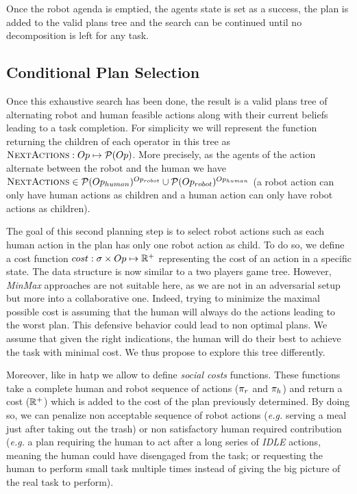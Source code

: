 \documentclass[a4paper,11pt,twoside]{StyleThese}
\begin{document}
Once the robot agenda is emptied, the agents state is set as a success, the plan is added to the valid plans tree and the search can be continued until no decomposition is left for any task.


\subsection{Conditional Plan Selection}
Once this exhaustive search has been done, the result is a valid plans tree of alternating robot and human feasible actions along with their current beliefs leading to a task completion. For simplicity we will represent the function returning the children of each operator in this tree as $\textsc{NextActions}: Op \mapsto \mathcal{P}(Op)$. More precisely, as the agents of the action alternate between the robot and the human we have $\textsc{NextActions} \in \mathcal{P}(Op_{human})^{Op_{robot}} \cup \mathcal{P}(Op_{robot})^{Op_{human}}$ (a robot action can only have human actions as children and a human action can only have robot actions as children). 

The goal of this second planning step is to select robot actions such as each human action in the plan has only one robot action as child.
To do so, we define a cost function $cost: \sigma \times Op \mapsto \mathbb{R}^+$ representing the cost of an action in a specific state. The data structure is now similar to a two players game tree. However, \textit{MinMax} approaches are not suitable here, as we are not in an adversarial setup but more into a collaborative one. Indeed, trying to minimize the maximal possible cost is assuming that the human will always do the actions leading to the worst plan. This defensive behavior could lead to non optimal plans. We assume that given the right indications, the human will do their best to achieve the task with minimal cost. We thus propose to explore this tree differently.

Moreover, like in \acrshort{hatp} we allow to define \textit{social costs} functions. These functions take a complete human and robot sequence of actions ($\pi_r$ and $\pi_h$) and return a cost ($\mathbb{R}^+$) which is added to the cost of the plan previously determined. By doing so, we can penalize non acceptable sequence of robot actions (\textit{e.g.} serving a meal just after taking out the trash) or non satisfactory human required contribution (\textit{e.g.} a plan requiring the human to act after a long series of \textit{IDLE} actions, meaning the human could have disengaged from the task; or requesting the human to perform small task multiple times instead of giving the big picture of the real task to perform).
\end{document}
